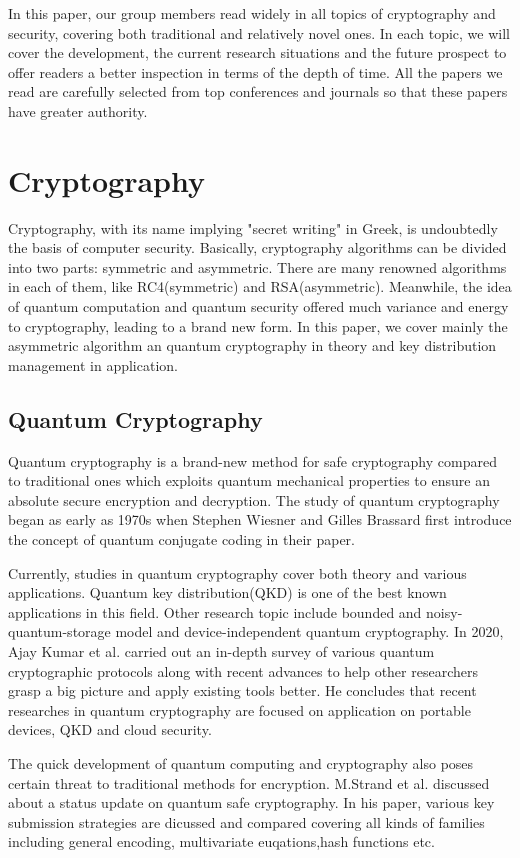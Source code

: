 \documentclass[conference]{IEEEtran}
\begin{document}
In this paper, our group members read widely in all topics of cryptography and security, covering both traditional and relatively novel ones. In each topic, we will cover the development, the current research situations and the future prospect to offer readers a better inspection in terms of the depth of time. All the papers we read are carefully selected from top conferences and journals so that these papers have greater authority.   

\section{Cryptography}
Cryptography, with its name implying "secret writing" in Greek, is undoubtedly the basis of computer security. Basically, cryptography algorithms can be divided into two parts: symmetric and asymmetric. There are many renowned algorithms in each of them, like RC4(symmetric) and RSA(asymmetric). Meanwhile, the idea of quantum computation and quantum security offered much variance and energy to cryptography, leading to a brand new form. In this paper, we cover mainly the asymmetric algorithm an quantum  cryptography in theory and key distribution management in application.

\subsection{Quantum Cryptography}
\par Quantum cryptography is a brand-new method for safe cryptography compared to traditional ones which exploits quantum mechanical properties to ensure an absolute secure encryption and decryption. The study of quantum cryptography began as early as 1970s when Stephen Wiesner and Gilles Brassard first introduce the concept of quantum conjugate coding in their paper. 
\par Currently, studies in quantum cryptography cover both theory and various applications. Quantum key distribution(QKD) is one of the best known applications in this field. Other research topic include bounded and noisy-quantum-storage model and device-independent quantum cryptography. In 2020, Ajay Kumar et al.\cite{ajay} carried out an in-depth survey of various quantum cryptographic protocols along with recent advances to help other researchers grasp a big picture and apply existing tools better. He concludes that recent researches in quantum cryptography are focused on application on portable devices, QKD and cloud security.
\par The quick development of quantum computing and cryptography also poses certain threat to traditional methods for encryption. M.Strand et al. \cite{strand}discussed about a status update on quantum safe cryptography. In his paper, various key submission strategies are dicussed and compared covering all kinds of families including general encoding, multivariate euqations,hash functions etc.
\end{document}
